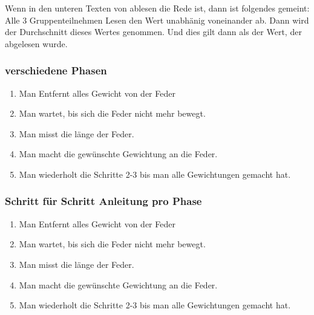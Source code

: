 \documentclass[../main.tex]{subfiles} %
\begin{document}
        Wenn in den unteren Texten von ablesen die Rede ist, dann ist folgendes gemeint:
        Alle 3 Gruppenteilnehmen Lesen den Wert unabhänig voneinander ab. Dann wird der Durchschnitt dieses Wertes genommen. Und dies gilt dann als der Wert, der abgelesen wurde.

 


        \subsubsection{verschiedene Phasen}\label{subsubsec:schritt-fur-schritt-anleitung}
        \begin{enumerate}
            \item Man Entfernt alles Gewicht von der Feder
            \item Man wartet, bis sich die Feder nicht mehr bewegt.
            \item Man misst die länge der Feder.
            \item Man macht die gewünschte Gewichtung an die Feder.
            \item Man wiederholt die Schritte 2-3 bis man alle Gewichtungen gemacht hat.
        \end{enumerate}

        \subsubsection{Schritt für Schritt Anleitung pro Phase}\label{subsubsec:schritt-fur-schritt-anleitung2}
        \begin{enumerate}
            \item Man Entfernt alles Gewicht von der Feder
            \item Man wartet, bis sich die Feder nicht mehr bewegt.
            \item Man misst die länge der Feder.
            \item Man macht die gewünschte Gewichtung an die Feder.
            \item Man wiederholt die Schritte 2-3 bis man alle Gewichtungen gemacht hat.
        \end{enumerate}
\end{document}
